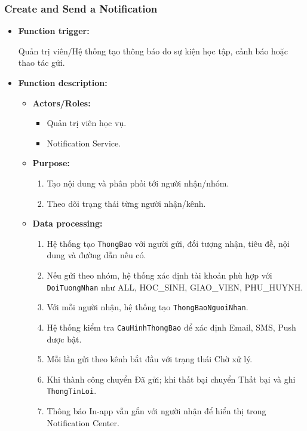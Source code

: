 \documentclass[12pt,a4paper,oneside]{report}
\begin{document}
\subsubsection{Create and Send a Notification}
\label{subsubsec:create-send-notification}

\begin{itemize}

    \item \textbf{Function trigger:}

    Quản trị viên/Hệ thống tạo thông báo do sự kiện học tập, cảnh báo hoặc thao tác gửi.

    \item \textbf{Function description:}

    \begin{itemize}

        \item \textbf{Actors/Roles:}
        \begin{itemize}
            \item Quản trị viên học vụ.
            \item Notification Service.
        \end{itemize}

        \item \textbf{Purpose:}
        \begin{enumerate}
            \item Tạo nội dung và phân phối tới người nhận/nhóm.
            \item Theo dõi trạng thái từng người nhận/kênh.
        \end{enumerate}

        \item \textbf{Data processing:}
        \begin{enumerate}
            \item Hệ thống tạo \texttt{ThongBao} với người gửi, đối tượng nhận, tiêu đề, nội dung và đường dẫn nếu có.
            \item Nếu gửi theo nhóm, hệ thống xác định tài khoản phù hợp với \texttt{DoiTuongNhan} như ALL, HOC\_SINH, GIAO\_VIEN, PHU\_HUYNH.
            \item Với mỗi người nhận, hệ thống tạo \texttt{ThongBaoNguoiNhan}.
            \item Hệ thống kiểm tra \texttt{CauHinhThongBao} để xác định Email, SMS, Push được bật.
            \item Mỗi lần gửi theo kênh bắt đầu với trạng thái Chờ xử lý.
            \item Khi thành công chuyển Đã gửi; khi thất bại chuyển Thất bại và ghi \texttt{ThongTinLoi}.
            \item Thông báo In-app vẫn gắn với người nhận để hiển thị trong Notification Center.
        \end{enumerate}


\end{itemize}
\end{itemize}
\end{document}

